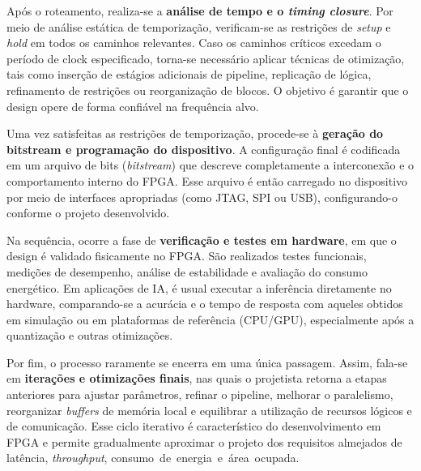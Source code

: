 Após o roteamento, realiza-se a \textbf{análise de tempo e o \textit{timing closure}}. Por meio de análise estática de temporização, verificam-se as restrições de \textit{setup} e \textit{hold} em todos os caminhos relevantes. Caso os caminhos críticos excedam o período de clock especificado, torna-se necessário aplicar técnicas de otimização, tais como inserção de estágios adicionais de pipeline, replicação de lógica, refinamento de restrições ou reorganização de blocos. O objetivo é garantir que o design opere de forma confiável na frequência alvo.

Uma vez satisfeitas as restrições de temporização, procede-se à \textbf{geração do bitstream e programação do dispositivo}. A configuração final é codificada em um arquivo de bits (\textit{bitstream}) que descreve completamente a interconexão e o comportamento interno do FPGA. Esse arquivo é então carregado no dispositivo por meio de interfaces apropriadas (como JTAG, SPI ou USB), configurando-o conforme o projeto desenvolvido.

Na sequência, ocorre a fase de \textbf{verificação e testes em hardware}, em que o design é validado fisicamente no FPGA. São realizados testes funcionais, medições de desempenho, análise de estabilidade e avaliação do consumo energético. Em aplicações de IA, é usual executar a inferência diretamente no hardware, comparando-se a acurácia e o tempo de resposta com aqueles obtidos em simulação ou em plataformas de referência (CPU/GPU), especialmente após a quantização e outras otimizações.

Por fim, o processo raramente se encerra em uma única passagem. Assim, fala-se em \textbf{iterações e otimizações finais}, nas quais o projetista retorna a etapas anteriores para ajustar parâmetros, refinar o pipeline, melhorar o paralelismo, reorganizar \textit{buffers} de memória local e equilibrar a utilização de recursos lógicos e de comunicação. Esse ciclo iterativo é característico do desenvolvimento em FPGA e permite gradualmente aproximar o projeto dos requisitos almejados de latência, \textit{throughput}, \mbox{consumo de energia e área ocupada.}



